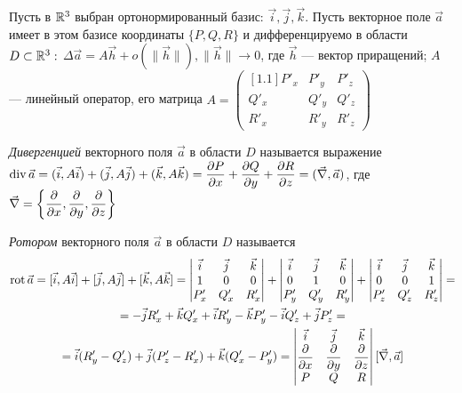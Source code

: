 \documentclass[a4paper,10pt]{article}
\begin{document}
	
	\jeolmnewheader
	
	Пусть в ${\mathbb R}^3$ выбран ортонормированный базис: $\vec{i}, \vec{j}, \vec{k}$. Пусть векторное поле $\vec{a}$ имеет в этом базисе координаты $\{P, Q, R\}$ и дифференцируемо в области $D \subset {\mathbb R}^3:$ $\Delta \vec{a} = A\vec{h} + o(\|\vec{h}\|), \|\vec{h}\|\to0$, где $\vec{h}$ --- вектор приращений; $A$ --- линейный оператор, его матрица $A=\left( \begin{matrix}[1.1] P'_x & P'_y & P'_z \\ Q'_x & Q'_y & Q'_z \\ R'_x & R'_y & R'_z \end{matrix} \right)$
	
	\begin{defn}
		\textit{Дивергенцией} векторного поля $\vec{a}$ в области $D$ называется выражение $\mathop{\operatorname{div}} \vec{a} = (\vec{i}, A\vec{i}) + (\vec{j}, A\vec{j}) + (\vec{k}, A\vec{k}) = \dfrac{\partial P}{\partial x} + \dfrac{\partial Q}{\partial y} + \dfrac{\partial R}{\partial z} = (\vec{\nabla}, \vec{a})$, где $\vec{\nabla} = \left\{\dfrac{\partial}{\partial x}, \dfrac{\partial}{\partial y}, \dfrac{\partial}{\partial z}\right\}$
	\end{defn}
	
	\begin{defn}
		\textit{Ротором} векторного поля $\vec{a}$ в области $D$ называется 
		\begin{multline*}
		\operatorname{\mathop{rot}} \vec{a} = [\vec{i}, A\vec{i}] + [\vec{j}, A\vec{j}] + [\vec{k}, A\vec{k}] = \left| \begin{matrix} \vec{i} & \vec{j} & \vec{k} \\ 1&0&0 \\ P_x' & Q_x' & R_x' \end{matrix} \right| + \left| \begin{matrix} \vec{i} & \vec{j} & \vec{k} \\ 0&1&0 \\ P_y' & Q_y' & R_y' \end{matrix} \right| + \left| \begin{matrix} \vec{i} & \vec{j} & \vec{k} \\ 0&0&1 \\ P_z' & Q_z' & R_z' \end{matrix} \right| =\\= -\vec{j}R_x' + \vec{k}Q_x' + \vec{i}R_y' - \vec{k}P_y' - \vec{i}Q'_z + \vec{j}P'_z =\\= \vec{i}(R'_y - Q'_z) + \vec{j}(P'_z-R'_x) + \vec{k}(Q'_x-P'_y) =
		\left| \begin{matrix} \vec{i} & \vec{j} & \vec{k} \\ \dfrac{\partial}{\partial x}&\dfrac{\partial}{\partial y}&\dfrac{\partial}{\partial z} \\ P & Q & R \end{matrix} \right| [\vec{\nabla}, \vec{a}]
		\end{multline*}
	\end{defn}
	
\end{document}
